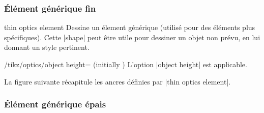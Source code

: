 \documentclass[a4paper]{ltxdoc}
\begin{document}
\subsubsection{Élément générique fin}

\begin{shape}{thin optics element}
Dessine un élement générique (utilisé pour des éléments plus spécifiques).
Cette |shape| peut être utile pour dessiner un objet non prévu, en lui donnant un style pertinent.

\begin{codeexample}[width=6cm]
\end{codeexample}

\begin{key}{/tikz/optics/object height= (initially )}
    L'option |object height| est applicable.
\end{key}

La figure suivante récapitule les ancres définies par |thin optics element|.

\begin{codeexample}[]
\Huge
{}
\end{codeexample}

\end{shape}

\subsubsection{Élément générique épais}
\end{document}
